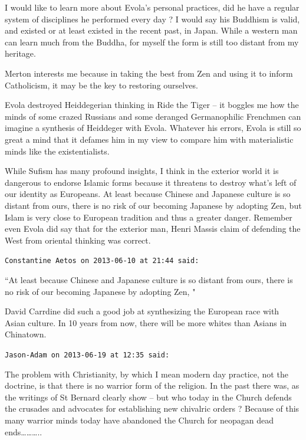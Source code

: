 \begin{footnotesize}
\begin{sffamily}
I would like to learn more about Evola's personal practices, did he have a regular system of disciplines he performed every day ? I would say his Buddhism is valid, and existed or at least existed in the recent past, in Japan. While a western man can learn much from the Buddha, for myself the form is still too distant from my heritage. 

Merton interests me because in taking the best from Zen and using it to inform Catholicism, it may be the key to restoring ourselves. 

Evola destroyed Heiddegerian thinking in Ride the Tiger – it boggles me how the minds of some crazed Russians and some deranged Germanophilic Frenchmen can imagine a synthesis of Heiddeger with Evola. Whatever his errors, Evola is still so great a mind that it defames him in my view to compare him with materialistic minds like the existentialists. 

While Sufism has many profound insights, I think in the exterior world it is dangerous to endorse Islamic forms because it threatens to destroy what's left of our identity as Europeans. At least because Chinese and Japanese culture is so distant from ours, there is no risk of our becoming Japanese by adopting Zen, but Islam is very close to European tradition and thus a greater danger. Remember even Evola did say that for the exterior man, Henri Massis claim of defending the West from oriental thinking was correct.


\hfill

\texttt{Constantine Aetos on 2013-06-10 at 21:44 said: }

``At least because Chinese and Japanese culture is so distant from ours, there is no risk of our becoming Japanese by adopting Zen, "

David Carrdine did such a good job at synthesizing the European race with Asian culture. In 10 years from now, there will be more whites than Asians in Chinatown.


\hfill

\texttt{Jason-Adam on 2013-06-19 at 12:35 said: }

The problem with Christianity, by which I mean modern day practice, not the doctrine, is that there is no warrior form of the religion. In the past there was, as the writings of St Bernard clearly show – but who today in the Church defends the crusades and advocates for establishing new chivalric orders ? Because of this many warrior minds today have abandoned the Church for neopagan dead ends………..


\hfill


\end{sffamily}\end{footnotesize}
